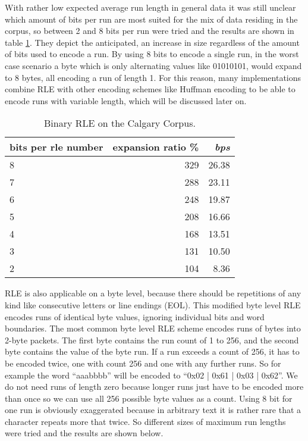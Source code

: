 \par{
	With rather low expected average run length in general data it was still unclear which amount of bits per run are most suited for the mix of data residing in the corpus, so between 2 and 8 bits per run were tried and the results are shown in table \ref{tab:t30 Binary RLE on the Calgary Corpus}. They depict the anticipated, an increase in size regardless of the amount of bits used to encode a run. By using 8 bits to encode a single run, in the worst case scenario a byte which is only alternating values like 01010101, would expand to 8 bytes, all encoding a run of length 1. For this reason, many implementations combine RLE with other encoding schemes like Huffman encoding to be able to encode runs with variable length, which will be discussed later on.
}

\begin{table}[h]
	\centering
	\begin{tabular}{l|r|r}
		bits per rle number &  expansion ratio \% & \textit{bps}\\
		\hline
		8 & 329 & 26.38\\
		7 & 288 & 23.11\\
		6 & 248 & 19.87\\
		5 & 208 & 16.66\\
		4 & 168 & 13.51\\
		3 & 131 & 10.50\\
		2 & 104 & 8.36\\
	\end{tabular}
	\caption{Binary RLE on the Calgary Corpus.}
	\label{tab:t30 Binary RLE on the Calgary Corpus}
\end{table}

\par{
RLE is also applicable on a byte level, because there should be repetitions of any kind like consecutive letters or line endings (EOL). This modified byte level RLE encodes runs of identical byte values, ignoring individual bits and word boundaries. The most common byte level RLE scheme encodes runs of bytes into 2-byte packets. The first byte contains the run count of 1 to 256, and the second byte contains the value of the byte run. If a run exceeds a count of 256, it has to be encoded twice, one with count 256 and one with any further runs. So for example the word \enquote{aaabbbb} will be encoded to \enquote{0x02 | 0x61 | 0x03 | 0x62}. We do not need runs of length zero because longer runs just have to be encoded more than once so we can use all 256 possible byte values as a count. Using 8 bit for one run is obviously exaggerated because in arbitrary text it is rather rare that a character repeats more that twice. So different sizes of maximum run lengths were tried and the results are shown below.
}

